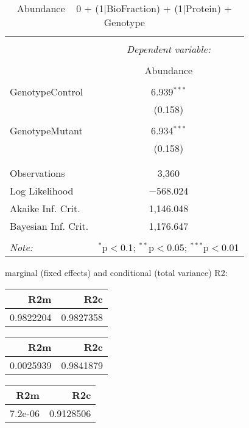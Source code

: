 \documentclass[11pt]{report}
\begin{document}
\begin{table}[!htbp] \centering 
  \caption{Abundance ~ 0 + (1|BioFraction) + (1|Protein) + Genotype} 
  \label{} 
\begin{tabular}{@{\extracolsep{5pt}}lc} 
\\[-1.8ex]\hline 
\hline \\[-1.8ex] 
 & \multicolumn{1}{c}{\textit{Dependent variable:}} \\ 
\cline{2-2} 
\\[-1.8ex] & Abundance \\ 
\hline \\[-1.8ex] 
 GenotypeControl & 6.939$^{***}$ \\ 
  & (0.158) \\ 
  & \\ 
 GenotypeMutant & 6.934$^{***}$ \\ 
  & (0.158) \\ 
  & \\ 
\hline \\[-1.8ex] 
Observations & 3,360 \\ 
Log Likelihood & $-$568.024 \\ 
Akaike Inf. Crit. & 1,146.048 \\ 
Bayesian Inf. Crit. & 1,176.647 \\ 
\hline 
\hline \\[-1.8ex] 
\textit{Note:}  & \multicolumn{1}{r}{$^{*}$p$<$0.1; $^{**}$p$<$0.05; $^{***}$p$<$0.01} \\ 
\end{tabular} 
\end{table} 
marginal (fixed effects) and conditional (total variance) R2:

\begin{tabular}{r|r}
\hline
R2m & R2c\\
\hline
0.9822204 & 0.9827358\\
\hline
\end{tabular}

\begin{tabular}{r|r}
\hline
R2m & R2c\\
\hline
0.0025939 & 0.9841879\\
\hline
\end{tabular}

\begin{tabular}{r|r}
\hline
R2m & R2c\\
\hline
7.2e-06 & 0.9128506\\
\hline
\end{tabular}
\end{document}
